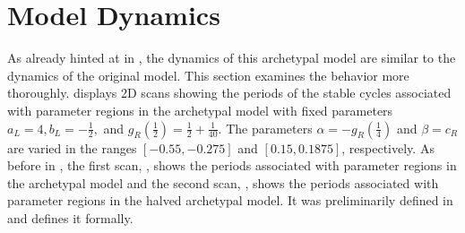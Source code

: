 \section{Model Dynamics}
\label{sec:arch.dynamics}

As already hinted at in , the dynamics of this archetypal model are similar to the dynamics of the original model.
This section examines the behavior more thoroughly.
 displays 2D scans showing the periods of the stable cycles associated with parameter regions in the archetypal model with fixed parameters $a_L = 4, b_L = -\frac{1}{2},$ and $g_R\left(\frac{1}{2}\right) = \frac{1}{2} + \frac{1}{40}$.
The parameters $\alpha = -g_R\left(\frac{1}{4}\right)$ and $\beta = c_R$ are varied in the ranges $[-0.55, -0.275]$ and $[0.15, 0.1875]$, respectively.
As before in , the first scan, , shows the periods associated with parameter regions in the archetypal model and the second scan, , shows the periods associated with parameter regions in the halved archetypal model.
It was preliminarily defined in  and  defines it formally.

